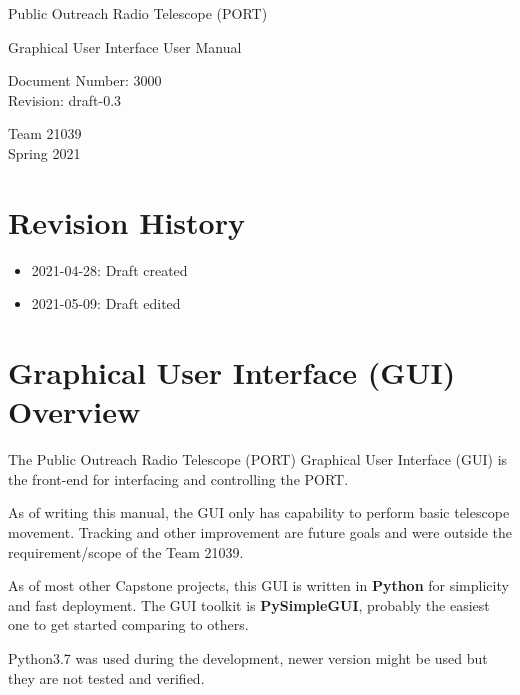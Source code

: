 \documentclass{article}
\begin{document}
\begin{titlepage}
  \begin{center}

    \vspace*{5cm}
    \huge Public Outreach Radio Telescope (PORT)

    \vspace*{2cm}
    \Large Graphical User Interface User Manual

    \vspace*{2cm}
    \large Document Number: 3000\\
    Revision: draft-0.3

    \vspace*{2.0cm}
    \large
    Team 21039\\
    Spring 2021

  \end{center}
\end{titlepage}

\tableofcontents
\pagebreak

\section{Revision History}
\begin{itemize}
  \item 2021-04-28: Draft created
  \item 2021-05-09: Draft edited
\end{itemize}


\section{Graphical User Interface (GUI) Overview}
The Public Outreach Radio Telescope (PORT) Graphical User Interface (GUI) is the front-end for interfacing and controlling the PORT.

As of writing this manual, the GUI only has capability to perform basic telescope movement. Tracking and other improvement are future goals and were outside the requirement/scope of the Team 21039.

As of most other Capstone projects, this GUI is written in \textbf{Python} for simplicity and fast deployment. The GUI toolkit is \textbf{PySimpleGUI}, probably the easiest one to get started comparing to others.

Python3.7 was used during the development, newer version might be used but they are not tested and verified.
\end{document}
